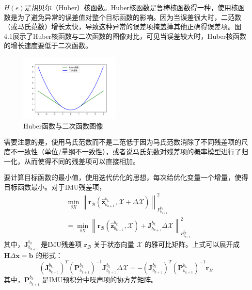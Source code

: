  $H(e) $是胡贝尔（Huber）核函数。Huber核函数是鲁棒核函数得一种，使用核函数是为了避免异常的误差值对整个目标函数的影响。因为当误差很大时，二范数（或马氏范数）增长太快，导致这种异常的误差项掩盖掉其他正确得误差项。图4.1展示了Huber核函数与二次函数的图像对比，可见当误差较大时，Huber核函数的增长速度要低于二次函数。
 \begin{figure}[h]\setlength{\belowcaptionskip}{-12pt}
 	\centering
 	\includegraphics[width=0.45\textwidth]{figures/chapter4/fig4_1}
 	\caption{Huber函数与二次函数图像}\label{fig4_1}
 \end{figure}


需要注意的是，使用马氏范数而不是二范低于因为马氏范数消除了不同残差项的尺度不一致性（单位/量纲不一致性），或者说马氏范数对残差项的概率模型进行了归一化，从而使得不同的残差项可以直接相加。

要计算目标函数的最小值，使用迭代优化的思想，每次给优化变量一个增量，使得目标函数最小。对于IMU残差项，
\begin{equation}
\label{eqn:4.6}
\begin{aligned}
& \min _{\delta X}\left\| \mathbf{r}_\mathcal{B}(\hat{\mathbf{z}}_{b_{k+1}}^{b_k}, \mathcal{X} + \Delta \mathcal{X} )  \right\|_{P_{b_{k+1}}^{b_k}}^{2} \\
&=
\min _{\delta X} 
\left\| 
\mathbf{r}_\mathcal{B}(\hat{\mathbf{z}}_{b_{k+1}}^{b_k},\mathcal{X}) 
+ \mathbf{J}_{b_{k+1}}^{b_k} \Delta \mathcal{X}  \right\| _{P_{b_{k+1}}^{b_k}}^{2}
\end{aligned}
\end{equation}
其中，$\mathbf{J}_{b_{k+1}}^{b_k}  $ 是IMU残差项 $\mathbf{r}_{\mathcal{B}} $ 关于状态向量 $\mathcal{X} $ 的雅可比矩阵。上式可以展开成 $\mathbf{H}\Delta \mathbf{x}=\mathbf{b} $ 的形式：
\[
(\mathbf{J} _{b_{k+1}}^{b_{k}})^{T} (\mathbf{P}_{b_{k+1}}^{b_{k}})^{-1} \mathbf{J}_{b_{k+1}}^{b_{k}} \Delta \mathcal{X}
=- (\mathbf{J}_{b_{k+1}}^{b_{k}})^{T} (\mathbf{P}_{b_{k+1}}^{b_{k}})^{-1} \mathbf{r}_{B}
\]
其中，$\mathbf{P}_{b_{k+1}}^{b_k} $ 是IMU预积分中噪声项的协方差矩阵。

